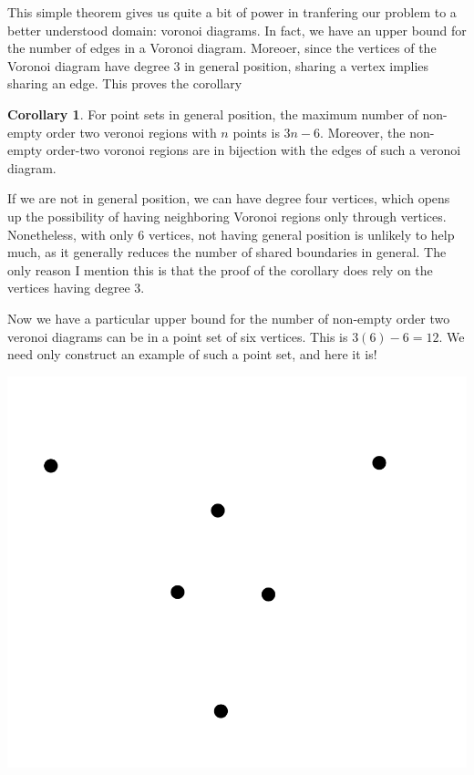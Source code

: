 \documentclass[12pt]{article}
\theoremstyle{definition}
\newtheorem{corollary}{Corollary}
\begin{document}
This simple theorem gives us quite a bit of power in tranfering our problem to a better understood domain: voronoi diagrams. In fact, we have an upper bound for the number of edges in a Voronoi diagram. Moreoer, since the vertices of the Voronoi diagram have degree $3$ in general position, sharing a vertex implies sharing an edge. This proves the corollary

\begin{corollary}
For point sets in general position, the maximum number of non-empty order two veronoi regions with $n$ points is $3n-6$. Moreover, the non-empty order-two voronoi regions are in bijection with the edges of such a veronoi diagram.
\end{corollary}

If we are not in general position, we can have degree four vertices, which opens up the possibility of having neighboring Voronoi regions only through vertices. Nonetheless, with only 6 vertices, not having general position is unlikely to help much, as it generally reduces the number of shared boundaries in general. The only reason I mention this is that the proof of the corollary does rely on the vertices having degree 3.

Now we have a particular upper bound for the number of non-empty order two veronoi diagrams can be in a point set of six vertices. This is $ 3(6) - 6 = 12 $. We need only construct an example of such a point set, and here it is!

\includegraphics[scale=1]{point_set.png} 
\end{document}
